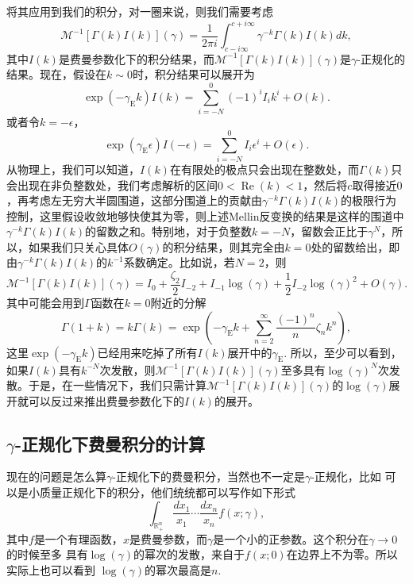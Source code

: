 \documentclass[12pt]{article}
\theoremstyle{definition}
\theoremstyle{plain}
\begin{document}
将其应用到我们的积分，对一圈来说，则我们需要考虑
\[
	\mathcal M^{-1}[\Gamma(k)I(k)](\gamma)=\frac{1}{2\pi i}\int_{c-i\infty}^{c+i\infty}\gamma^{-k}\Gamma(k)I(k)dk,
\]
其中$I(k)$是费曼参数化下的积分结果，而$\mathcal M^{-1}[\Gamma(k)I(k)](\gamma)$是$\gamma$-正规化的结果。现在，假设在$k\sim 0$时，积分结果可以展开为
\[
	\exp (-\gamma_{\mathrm{E}} k)I(k)=\sum_{i=-N}^0 (-1)^iI_i k^i+O(k).
\]
或者令$k=-\epsilon$，
\[
	\exp (\gamma_{\mathrm{E}} \epsilon)I(-\epsilon)=\sum_{i=-N}^0 I_i \epsilon^i+O(\epsilon).
\]
从物理上，我们可以知道，$I(k)$在有限处的极点只会出现在整数处，而$\Gamma(k)$只会出现在非负整数处，我们考虑解析的区间$0<\operatorname{Re}(k)<1$，然后将$c$取得接近$0$，再考虑左无穷大半圆围道，这部分围道上的贡献由$\gamma^{-k}\Gamma(k)I(k)$的极限行为控制，这里假设收敛地够快使其为零，则上述Mellin反变换的结果是这样的围道中$\gamma^{-k}\Gamma(k)I(k)$的留数之和。特别地，对于负整数$k=-N$，留数会正比于$\gamma^N$，所以，如果我们只关心具体$O(\gamma)$的积分结果，则其完全由$k=0$处的留数给出，即由$\gamma^{-k}\Gamma(k)I(k)$的$k^{-1}$系数确定。比如说，若$N=2$，则
\[
	\mathcal M^{-1}[\Gamma(k)I(k)](\gamma)=I_0+\frac{\zeta_2}{2}I_{-2}+I_{-1}\log(\gamma)+\frac{1}{2}I_{-2}\log(\gamma)^2 + O(\gamma).
\]
其中可能会用到$\Gamma$函数在$k=0$附近的分解
\[
	\Gamma(1+k)=k\Gamma(k)=\exp \left(-\gamma_{\mathrm{E}} k+\sum_{n=2}^{\infty} \frac{(-1)^{n}}{n} \zeta_{n} k^{n}\right),
\]
这里$\exp (-\gamma_{\mathrm{E}} k)$已经用来吃掉了所有$I(k)$展开中的$\gamma_{\mathrm{E}}$. 所以，至少可以看到，如果$I(k)$具有$k^{-N}$次发散，则$\mathcal M^{-1}[\Gamma(k)I(k)](\gamma)$至多具有$\log(\gamma)^N$次发散。于是，在一些情况下，我们只需计算$\mathcal M^{-1}[\Gamma(k)I(k)](\gamma)$的$\log(\gamma)$展开就可以反过来推出费曼参数化下的$I(k)$的展开。

\subsection{$\gamma$-正规化下费曼积分的计算}

现在的问题是怎么算$\gamma$-正规化下的费曼积分，当然也不一定是$\gamma$-正规化，比如
可以是小质量正规化下的积分，他们统统都可以写作如下形式
\[
	\int_{\mathbb R_+^n}\frac{dx_1}{x_1}\cdots \frac{dx_n}{x_n}f(x;\gamma),
\]
其中$f$是一个有理函数，$x$是费曼参数，而$\gamma$是一个小的正参数。这个积分在$\gamma\to 0$的时候至多
具有$\log(\gamma)$的幂次的发散，来自于$f(x;0)$在边界上不为零。所以实际上也可以看到
$\log(\gamma)$的幂次最高是$n$.
\end{document}
